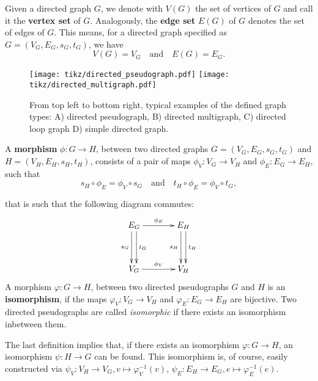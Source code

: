 
Given a directed graph $G$, we denote with $V(G)$ the set of vertices
of $G$ and call it the \textbf{vertex set} of $G$. Analogously, the
\textbf{edge set} $E(G)$ of $G$ denotes the set of edges of $G$. This
means, for a directed graph specified as $G = (V_G,E_G,s_G,t_G)$, we
have \[V(G) = V_G \quad \mathrm{and} \quad E(G) = E_G.\]

\begin{figure}
  \centering

  \texttt{[image: tikz/directed\_pseudograph.pdf]}
  \hfill
  \texttt{[image: tikz/directed\_multigraph.pdf]}

  \caption{From top left to bottom right, typical examples of the
    defined graph types: A) directed pseudograph, B) directed
    multigraph, C) directed loop graph D) simple directed
    graph.} \label{fig:M1}
\end{figure}

A \textbf{morphism} $\phi: G \to H$, between two directed graphs
$G=(V_G,E_G,s_G,t_G)$ and $H=(V_H,E_H,s_H,t_H)$, consists of a pair of
maps $\phi_V: V_G \to V_H$ and $\phi_E: E_G \to E_H$, such that
\[
s_H \circ \phi_E = \phi_V \circ s_G \mathrm{\quad and \quad} t_H \circ
\phi_E = \phi_V \circ t_G,
\]

that is such that the following diagram commutes:
%
\begin{align*} 
  \xymatrix@+=1.3cm{E_G \ar^{t_G}@<0.66ex>[d] \ar_{s_G}@<-0.66ex>[d]
    \ar^{\phi_E}[r] & E_H \ar^{t_H}@<0.66ex>[d]
    \ar_{s_H}@<-0.66ex>[d]\\ V_G \ar^{\phi_V}[r] & V_H}
\end{align*}
%
A morphism $\varphi: G \to H$, between two directed pseudographs $G$
and $H$ is an \textbf{isomorphism}, if the maps $\varphi_V: V_G \to
V_H$ and $\varphi_E: E_G \to E_H$ are bijective. Two directed
pseudographs are called \textit{isomorphic} if there exists an
isomorphism inbetween them.

\begin{remark}
  The last definition implies that, if there exists an isomorphism
  $\varphi: G \to H$, an isomorphism $\psi: H \to G$ can be
  found. This isomorphism is, of course, easily constructed via
  $\psi_V: V_H \to V_G, v \mapsto \varphi_V^{-1}(v)$, $\psi_E: E_H \to
  E_G, e \mapsto \varphi_E^{-1}(e)$.
\end{remark}

